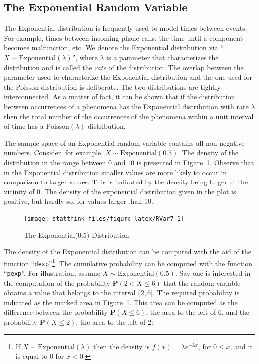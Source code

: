\documentclass[]{krantz}
\newcommand{\Prob}{\mathbf{P}}
\theoremstyle{definition}
\theoremstyle{definition}
\theoremstyle{definition}
\theoremstyle{remark}
\begin{document}
\hypertarget{the-exponential-random-variable}{%
\subsection{The Exponential Random Variable}\label{the-exponential-random-variable}}

The Exponential distribution is frequently used to model times between
events. For example, times between incoming phone calls, the time until
a component becomes malfunction, etc. We denote the Exponential
distribution via ``\(X \sim \mathrm{Exponential}(\lambda)\)'', where
\(\lambda\) is a parameter that characterizes the distribution and is
called the \emph{rate} of the distribution. The overlap between the parameter
used to characterize the Exponential distribution and the one used for
the Poisson distribution is deliberate. The two distributions are
tightly interconnected. As a matter of fact, it can be shown that if the
distribution between occurrences of a phenomena has the Exponential
distribution with rate \(\lambda\) then the total number of the
occurrences of the phenomena within a unit interval of time has a
\(\mathrm{Poisson}(\lambda)\) distribution.

The sample space of an Exponential random variable contains all
non-negative numbers. Consider, for example,
\(X \sim \mathrm{Exponential}(0.5)\). The density of the distribution in
the range between 0 and 10 is presented in Figure~\ref{fig:RVar7}.
Observe that in the Exponential distribution smaller values are more
likely to occur in comparison to larger values. This is indicated by the
density being larger at the vicinity of 0. The density of the
exponential distribution given in the plot is positive, but hardly so,
for values larger than 10.

\begin{figure}

{\centering \texttt{[image: statthink\_files/figure-latex/RVar7-1]} 

}

\caption{The Exponential(0.5) Distribution}\label{fig:RVar7}
\end{figure}

The density of the Exponential distribution can be computed with the aid
of the function ``\texttt{dexp}''\footnote{If \(X \sim \mathrm{Exponential}(\lambda)\) then the density
  is \(f(x) =\lambda e^{-\lambda x}\), for \(0 \leq x\), and it is equal
  to 0 for \(x < 0\).}. The cumulative probability can be computed
with the function ``\texttt{pexp}''. For illustration, assume
\(X \sim \mathrm{Exponential}(0.5)\). Say one is interested in the
computation of the probability \(\Prob(2 < X \leq 6)\) that the random
variable obtains a value that belongs to the interval \((2,6]\). The
required probability is indicated as the marked area in
Figure~\ref{fig:RVar7}. This area can be computed as the difference
between the probability \(\Prob(X \leq 6)\), the area to the left of 6,
and the probability \(\Prob(X \leq 2)\), the area to the left of 2:
\end{document}
